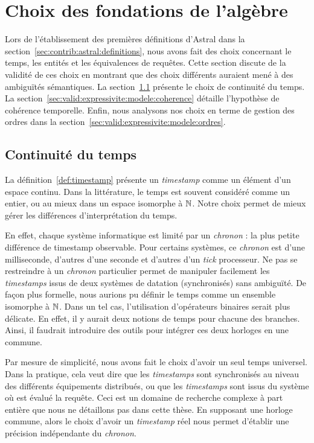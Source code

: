 \section{Choix des fondations de l'algèbre}\label{sec:valid:expressivite:modele}
Lors de l'établissement des premières définitions d'Astral dans la section~\ref{sec:contrib:astral:definitions}, nous avons fait des choix concernant le temps, les entités et les équivalences de requêtes. Cette section discute de la validité de ces choix en montrant que des choix différents auraient mené à des ambiguïtés sémantiques. La section~\ref{sec:valid:expressivite:modele:temps} présente le choix de continuité du temps. La section~\ref{sec:valid:expressivite:modele:coherence} détaille l'hypothèse de cohérence temporelle. Enfin, nous analysons nos choix en terme de gestion des ordres dans la section~\ref{sec:valid:expressivite:modele:ordres}.

\subsection{Continuité du temps}\label{sec:valid:expressivite:modele:temps}
La définition~\ref{def:timestamp} présente un \textit{timestamp} comme un élément d'un espace continu. Dans la littérature, le temps est souvent considéré comme un entier, ou au mieux dans un espace isomorphe à $\mathbb{N}$. Notre choix permet de mieux gérer les différences d'interprétation du temps.

En effet, chaque système informatique est limité par un \textit{chronon} : la plus petite différence de timestamp observable. Pour certains systèmes, ce \textit{chronon} est d'une milliseconde, d'autres d'une seconde et d'autres d'un \textit{tick} processeur. Ne pas se restreindre à un \textit{chronon} particulier permet de manipuler facilement les \textit{timestamps} issus de deux systèmes de datation (synchronisés) sans ambiguïté. De façon plus formelle, nous aurions pu définir le temps comme un ensemble isomorphe à $\mathbb{N}$. Dans un tel cas, l'utilisation d'opérateurs binaires serait plus délicate. En effet, il y aurait deux notions de temps pour chacune des branches. Ainsi, il faudrait introduire des outils pour intégrer ces deux horloges en une commune.

Par mesure de simplicité, nous avons fait le choix d'avoir un seul temps universel. Dans la pratique, cela veut dire que les \textit{timestamps} sont synchronisés au niveau des différents équipements distribués, ou que les \textit{timestamps} sont issus du système où est évalué la requête. Ceci est un domaine de recherche complexe à part entière que nous ne détaillons pas dans cette thèse. En supposant une horloge commune, alors le choix d'avoir un \textit{timestamp} réel nous permet d'établir une précision indépendante du \textit{chronon}.

